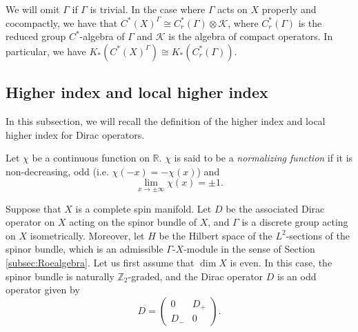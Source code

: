 \documentclass[12pt, reqno]{amsart}
\theoremstyle{plain}%
\theoremstyle{definition}
\theoremstyle{remark}
\numberwithin{equation}{section}
\newcommand{\Z}{\mathbb{Z}}
\newcommand{\R}{\mathbb{R}}
\begin{document}
We will omit $\Gamma$ if $\Gamma$ is trivial. In the case where $\Gamma$ acts on $X$ properly and cocompactly, we have that $C^*(X)^\Gamma\cong C^*_r(\Gamma)\otimes \mathcal K$, where $C^*_r(\Gamma)$ is the reduced group $C^*$-algebra of $\Gamma$ and $\mathcal K$ is the algebra of compact operators. In particular, we have $K_*(C^*(X)^\Gamma)\cong K_*(C^*_r(\Gamma))$.
\subsection{Higher index and local higher index}\label{subsec:higher_index}
In this subsection, we will recall the definition of the higher index and local higher index for Dirac operators. 

Let $\chi$ be a continuous function on $\R$. $\chi$ is said to be a \emph{normalizing function} if it is non-decreasing, odd (i.e. $\chi(-x) = -\chi(x)$) and  
\[ \lim_{x\to \pm \infty} \chi(x) = \pm 1. \]  

Suppose that  $X$ is a complete spin manifold. Let $D$  be the associated Dirac operator on $X$ acting on the spinor bundle of $X$, and  $\Gamma$  is a discrete group acting on $X$  isometrically. Moreover, let $H$ be the Hilbert space of the $L^2$-sections of the spinor bundle, which is an admissible $\Gamma$-$X$-module in the sense of Section \ref{subsec:Roealgebra}.
Let us first assume that $\dim X$ is even. In this case, the spinor bundle is naturally $\Z_2$-graded, and the Dirac operator $D$ is an odd  operator given by
$$D=\begin{pmatrix}
	0&D_+\\D_-&0
\end{pmatrix}.$$
\end{document}
